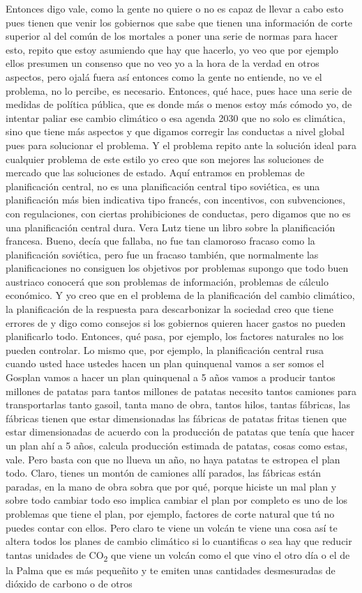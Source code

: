 Entonces digo vale, como la gente no quiere o no es capaz de llevar a cabo esto pues tienen que venir los gobiernos que sabe que tienen una información de corte superior al del común de los mortales a poner una serie de normas para hacer esto, repito que estoy asumiendo que hay que hacerlo, yo veo que por ejemplo ellos presumen un consenso que no veo yo a la hora de la verdad en otros aspectos, pero ojalá fuera así entonces como la gente no entiende, no ve el problema, no lo percibe, es necesario. Entonces, qué hace, pues hace una serie de medidas de política pública, que es donde más o menos estoy más cómodo yo, de intentar paliar ese cambio climático o esa agenda 2030 que no solo es climática, sino que tiene más aspectos y que digamos corregir las conductas a nivel global pues para solucionar el problema. Y el problema repito ante la solución ideal para cualquier problema de este estilo yo creo que son mejores las soluciones de mercado que las soluciones de estado. Aquí entramos en problemas de planificación central, no es una planificación central tipo soviética, es una planificación más bien indicativa tipo francés, con incentivos, con subvenciones, con regulaciones, con ciertas prohibiciones de conductas, pero digamos que no es una planificación central dura. Vera Lutz tiene un libro sobre la planificación francesa. Bueno, decía que fallaba, no fue tan clamoroso fracaso como la planificación soviética, pero fue un fracaso también, que normalmente las planificaciones no consiguen los objetivos por problemas supongo que todo buen austriaco conocerá que son problemas de información, problemas de cálculo económico. Y yo creo que en el problema de la planificación del cambio climático, la planificación de la respuesta para descarbonizar la sociedad creo que tiene errores de y digo como consejos si los gobiernos quieren hacer gastos no pueden planificarlo todo. Entonces, qué pasa, por ejemplo, los factores naturales no los pueden controlar. Lo mismo que, por ejemplo, la planificación central rusa cuando usted hace ustedes hacen un plan quinquenal vamos a ser somos el Gosplan vamos a hacer un plan quinquenal a 5 años vamos a producir tantos millones de patatas para tantos millones de patatas necesito tantos camiones para transportarlas tanto gasoil, tanta mano de obra, tantos hilos, tantas fábricas, las fábricas tienen que estar dimensionadas las fábricas de patatas fritas tienen que estar dimensionadas de acuerdo con la producción de patatas que tenía que hacer un plan ahí a 5 años, calcula producción estimada de patatas, cosas como estas, vale. Pero basta con que no llueva un año, no haya patatas te estropea el plan todo. Claro, tienes un montón de camiones allí parados, las fábricas están paradas, en la mano de obra sobra que por qué, porque hiciste un mal plan y sobre todo cambiar todo eso implica cambiar el plan por completo es uno de los problemas que tiene el plan, por ejemplo, factores de corte natural que tú no puedes contar con ellos. Pero claro te viene un volcán te viene una cosa así te altera todos los planes de cambio climático si lo cuantificas o sea hay que reducir tantas unidades de CO\textsubscript{2} que viene un volcán como el que vino el otro día o el de la Palma que es más pequeñito y te emiten unas cantidades desmesuradas de dióxido de carbono o de otros 